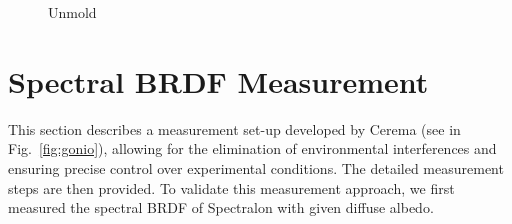 \begin{figure}[!tb]
    \centering
    \hfil
    \caption{Unmold}
    \label{fig:unmould}
\end{figure}

\section{Spectral BRDF Measurement}

This section describes a measurement set-up developed by Cerema (see in Fig.~\ref{fig:gonio}), allowing for the elimination of environmental interferences and ensuring precise control over experimental conditions.
The detailed measurement steps are then provided.
To validate this measurement approach, we first measured the spectral BRDF of Spectralon with given diffuse albedo.



